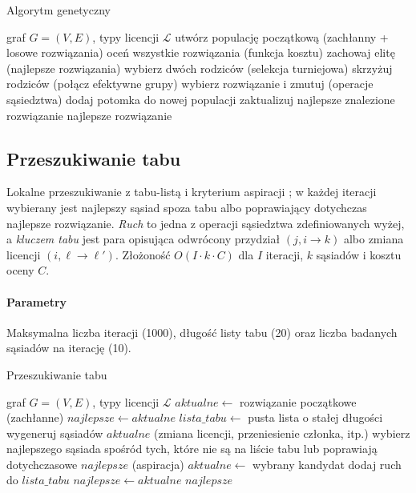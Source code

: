 \begin{algorithm}[H]
  \caption{Algorytm genetyczny}
  \label{alg:ga}
  \begin{algorithmic}[1]
    \Require graf $G=(V,E)$, typy licencji $\mathcal{L}$
    \State utwórz populację początkową (zachłanny + losowe rozwiązania)
    \State oceń wszystkie rozwiązania (funkcja kosztu)
    \State zachowaj elitę (najlepsze rozwiązania)
    \State wybierz dwóch rodziców (selekcja turniejowa)
    \State skrzyżuj rodziców (połącz efektywne grupy)
    \Else
    \State wybierz rozwiązanie i zmutuj (operacje sąsiedztwa)
    \EndIf
    \State dodaj potomka do nowej populacji
    \EndWhile
    \State zaktualizuj najlepsze znalezione rozwiązanie
    \EndFor
    \State \Return najlepsze rozwiązanie
  \end{algorithmic}
\end{algorithm}



\subsection{Przeszukiwanie tabu}\label{subsec:tabu}
Lokalne przeszukiwanie z tabu-listą i kryterium aspiracji \cite{glover1989}; w każdej iteracji wybierany jest najlepszy sąsiad spoza tabu albo poprawiający dotychczas najlepsze rozwiązanie. \emph{Ruch} to jedna z operacji sąsiedztwa zdefiniowanych wyżej, a \emph{kluczem tabu} jest para opisująca odwrócony przydział $(j, i\to k)$ albo zmiana licencji $(i,\ell\to\ell')$. Złożoność $O(I\cdot k\cdot C)$ dla \(I\) iteracji, \(k\) sąsiadów i kosztu oceny \(C\).

\paragraph{Parametry}
Maksymalna liczba iteracji (1000), długość listy tabu (20) oraz liczba badanych sąsiadów na iterację (10).

\begin{algorithm}[H]
  \caption{Przeszukiwanie tabu}
  \label{alg:tabu}
  \begin{algorithmic}[1]
    \Require graf $G=(V,E)$, typy licencji $\mathcal{L}$
    \State $aktualne \gets$ rozwiązanie początkowe (zachłanne)
    \State $najlepsze \gets aktualne$
    \State $lista\_tabu \gets$ pusta lista o stałej długości
    \State wygeneruj sąsiadów $aktualne$ (zmiana licencji, przeniesienie członka, itp.)
    \State wybierz najlepszego sąsiada spośród tych, które nie są na liście tabu lub poprawiają dotychczasowe $najlepsze$ (aspiracja)
    \State $aktualne \gets$ wybrany kandydat
    \State dodaj ruch do $lista\_tabu$
    \State $najlepsze \gets aktualne$
    \EndIf
    \EndIf
    \EndFor
    \State \Return $najlepsze$
  \end{algorithmic}
\end{algorithm}



